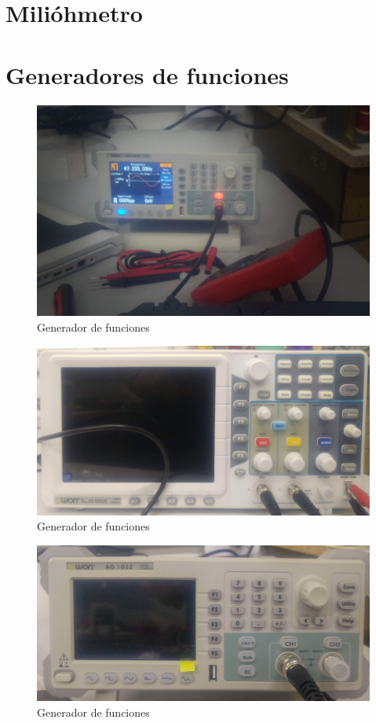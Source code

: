 \section{Milióhmetro}
\section{Generadores de funciones}

\begin{figure}[htbp]
  \centering
  \includegraphics[width=\textwidth,height=\textheight,keepaspectratio]{images/fotos/generadordefunciones1.jpg}
  \caption{Generador de funciones}
  \label{fig:generador_funciones_1}
\end{figure}

\begin{figure}[htbp]
  \centering
  \includegraphics[width=\textwidth,height=\textheight,keepaspectratio]{images/fotos/generadordefunciones2.jpg}
  \caption{Generador de funciones}
  \label{fig:generador_funciones_2}
\end{figure}

\begin{figure}[htbp]
  \centering
  \includegraphics[width=\textwidth,height=\textheight,keepaspectratio]{images/fotos/generadordefunciones3.jpg}
  \caption{Generador de funciones}
  \label{fig:generador_funciones_3}
\end{figure}
